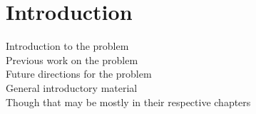 \chapter{Introduction}	%
Introduction to the problem \\
Previous work on the problem \\
Future directions for the problem \\
General introductory material \\
Though that may be mostly in their respective chapters
\endinput